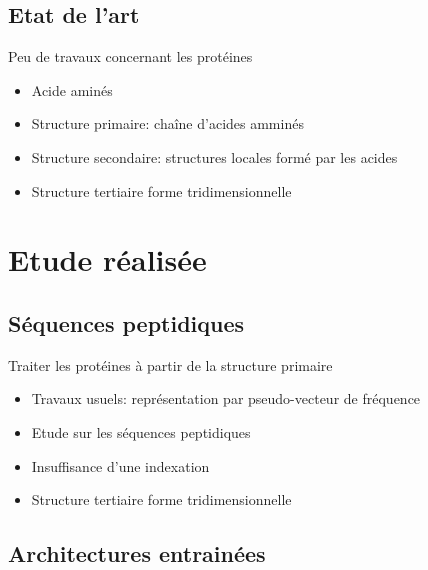 \documentclass{beamer}
\begin{document}
\subsection{Etat de l'art}

\begin{frame}{Peu de travaux concernant les protéines}

    \begin{itemize}
    \item Acide aminés 
    \item Structure primaire: chaîne d'acides amminés\pause
    \item Structure secondaire: structures locales formé par les acides\pause
    \item Structure tertiaire forme tridimensionnelle \pause
    \end{itemize}
\end{frame}

\section{Etude réalisée}

\subsection{Séquences peptidiques}

\begin{frame}{Traiter les protéines à partir de la structure primaire}

    \begin{itemize}
    \item Travaux usuels: représentation par pseudo-vecteur de fréquence\pause
    \item Etude sur les séquences peptidiques\pause
    \item Insuffisance d'une indexation\pause
    \item Structure tertiaire forme tridimensionnelle \pause
    \end{itemize}
\end{frame}

\subsection{Architectures entrainées}
\end{document}
